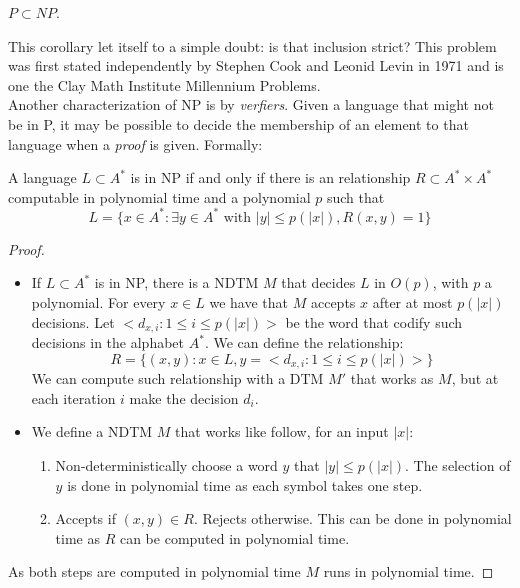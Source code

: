 \begin{corollary}
  $P \subset NP$.
\end{corollary}

This corollary let itself to a simple doubt: is that inclusion strict? This problem was first stated independently by Stephen Cook and  Leonid Levin in 1971\cite{cook2006p} and is one the Clay Math Institute Millennium Problems.\\

Another characterization of NP is by \emph{verfiers}. Given a language that might not be in P, it may be possible to decide the membership of an element to that language when a \emph{proof} is given. Formally:

\begin{proposition}
  A language $L\subset A^*$ is in NP if and only if there is an relationship $R\subset A^*\times A^*$  computable in polynomial time and a polynomial $p$ such that
  $$L = \{x \in A^*:\exists y \in A^* \text{ with } |y | \le p(|x|), R(x, y) = 1\}$$
\end{proposition}
\begin{proof}\hfill
\begin{itemize}
\item[\fbox{$\Rightarrow$}] If $L\subset A^*$ is in NP, there is a NDTM $M$ that decides $L$ in $O(p)$, with $p$ a polynomial. For every $x\in L$ we have that $M$ accepts $x$ after at most $p(|x|)$ decisions. Let $<d_{x,i} : 1 \le i \le p(|x|)>$ be the word that codify such decisions in the alphabet $A^*$. We can define the relationship:
  $$R = \{(x,y)  : x \in L, y = <d_{x,i} : 1 \le i \le p(|x|)>\}$$
  We can compute such relationship with a DTM $M'$ that works as $M$, but at each iteration $i$ make the decision $d_i$. 
\item[\fbox{$\Leftarrow$}] We define a NDTM $M$ that works like follow, for an input $|x|$:
  \begin{enumerate}
  \item Non-deterministically choose a word $y$ that $|y|\le p(|x|)$. The selection of $y$ is done in polynomial time as each symbol takes one step.
  \item Accepts if $(x,y)\in R$. Rejects otherwise. This can be done in polynomial time as $R$ can be computed in polynomial time.
    \end{enumerate}
  \end{itemize}
  As both steps are computed in polynomial time $M$ runs in polynomial time.  
\end{proof}

